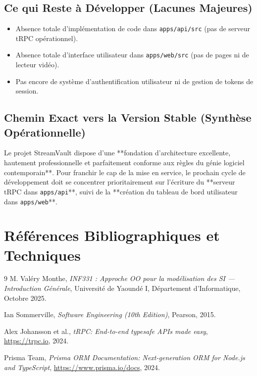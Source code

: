 \documentclass[11pt,a4paper]{article}
\begin{document}
\subsection{Ce qui Reste à Développer (Lacunes Majeures)}
\begin{itemize}
    \item Absence totale d'implémentation de code dans \texttt{apps/api/src} (pas de serveur tRPC opérationnel).
    \item Absence totale d'interface utilisateur dans \texttt{apps/web/src} (pas de pages ni de lecteur vidéo).
    \item Pas encore de système d'authentification utilisateur ni de gestion de tokens de session.
\end{itemize}

\subsection{Chemin Exact vers la Version Stable (Synthèse Opérationnelle)}
Le projet StreamVault dispose d'une **fondation d'architecture excellente, hautement professionnelle et parfaitement conforme aux règles du génie logiciel contemporain**. 
Pour franchir le cap de la mise en service, le prochain cycle de développement doit se concentrer prioritairement sur l'écriture du **serveur tRPC dans \texttt{apps/api}**, suivi de la **création du tableau de bord utilisateur dans \texttt{apps/web}**.

\section{Références Bibliographiques et Techniques}
\begin{thebibliography}{9}
    M. Valéry Monthe,
    \emph{INF331 : Approche OO pour la modélisation des SI — Introduction Générale},
    Université de Yaoundé I, Département d'Informatique, Octobre 2025.
    
    Ian Sommerville,
    \emph{Software Engineering (10th Edition)},
    Pearson, 2015.
    
    Alex Johansson et al.,
    \emph{tRPC: End-to-end typesafe APIs made easy},
    \url{https://trpc.io}, 2024.
    
    Prisma Team,
    \emph{Prisma ORM Documentation: Next-generation ORM for Node.js and TypeScript},
    \url{https://www.prisma.io/docs}, 2024.
\end{thebibliography}
\end{document}
